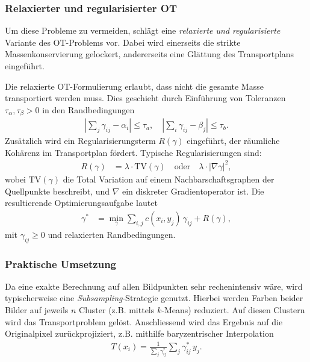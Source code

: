 \subsubsection{Relaxierter und regularisierter OT}
Um diese Probleme zu vermeiden,
schlägt \cite{mongekant:color} eine \emph{relaxierte und regularisierte}
Variante des OT-Problems vor.
Dabei wird einerseits die strikte Massenkonservierung gelockert,
andererseits eine Glättung des Transportplans eingeführt.

Die relaxierte OT-Formulierung erlaubt,
dass nicht die gesamte Masse transportiert werden muss.
Dies geschieht durch Einführung von Toleranzen $\tau_\alpha, \tau_\beta > 0$
in den Randbedingungen
\begin{align*}
\left| \sum_{j} \gamma_{ij} - \alpha_i \right|
\leq
\tau_a
, \quad
\left| \sum_{i} \gamma_{ij} - \beta_j \right|
\leq
\tau_b.
\end{align*}
Zusätzlich wird ein Regularisierungsterm $R(\gamma)$ eingeführt,
der räumliche Kohärenz im Transportplan fördert.
Typische Regularisierungen sind:
\begin{align*}
R(\gamma)
&=
\lambda \cdot \mathrm{TV}(\gamma)
\quad \text{oder} \quad
\lambda \cdot |\nabla \gamma|^2,
\end{align*}
wobei $\mathrm{TV}(\gamma)$ die Total Variation
auf einem Nachbarschaftsgraphen der Quellpunkte beschreibt,
und $\nabla$ ein diskreter Gradientoperator ist.
Die resultierende Optimierungsaufgabe lautet
\begin{align*}
\gamma^\ast
&=
\min_{\gamma} \sum_{i,j} c(x_i, y_j)\, \gamma_{ij} + R(\gamma),
\end{align*}
mit $\gamma_{ij} \geq 0$ und relaxierten Randbedingungen.

\subsubsection{Praktische Umsetzung}
Da eine exakte Berechnung auf allen Bildpunkten sehr rechenintensiv wäre,
wird typischerweise eine \emph{Subsampling}-Strategie genutzt.
Hierbei werden Farben beider Bilder auf jeweils $n$ Cluster
(z.B. mittels $k$-Means) reduziert.
Auf diesen Clustern wird das Transportproblem gelöst.
Anschliessend wird das Ergebnis auf die Originalpixel zurückprojiziert,
z.B. mithilfe baryzentrischer Interpolation
\begin{align*}
T(x_i)
=
\frac{1}{\sum_j \gamma^\ast_{ij}} \sum_j \gamma^\ast_{ij} \, y_j.
\end{align*}


